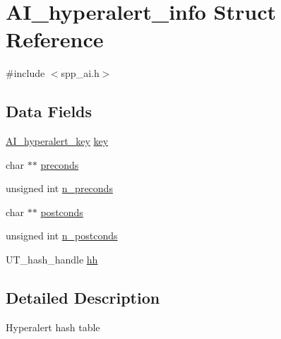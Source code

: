 \hypertarget{structAI__hyperalert__info}{
\section{AI\_\-hyperalert\_\-info Struct Reference}
\label{structAI__hyperalert__info}
}


{\ttfamily \#include $<$spp\_\-ai.h$>$}

\subsection*{Data Fields}
\begin{DoxyCompactItemize}
\item 
\hyperlink{structAI__hyperalert__key}{AI\_\-hyperalert\_\-key} \hyperlink{structAI__hyperalert__info_a9d461da8f00415ef03b24edb3bbd6cf8}{key}
\item 
char $\ast$$\ast$ \hyperlink{structAI__hyperalert__info_a8ac4e028c47a98a8be5afd4363164031}{preconds}
\item 
unsigned int \hyperlink{structAI__hyperalert__info_a616c16f364dbb2d726e88df6b364ea40}{n\_\-preconds}
\item 
char $\ast$$\ast$ \hyperlink{structAI__hyperalert__info_a6a63385397bf814153d7bb20b52840d9}{postconds}
\item 
unsigned int \hyperlink{structAI__hyperalert__info_a73322b6cad3e883abed03b62c6c21719}{n\_\-postconds}
\item 
UT\_\-hash\_\-handle \hyperlink{structAI__hyperalert__info_a6915bec67d383f374e758b44f50b48ff}{hh}
\end{DoxyCompactItemize}


\subsection{Detailed Description}
Hyperalert hash table 

